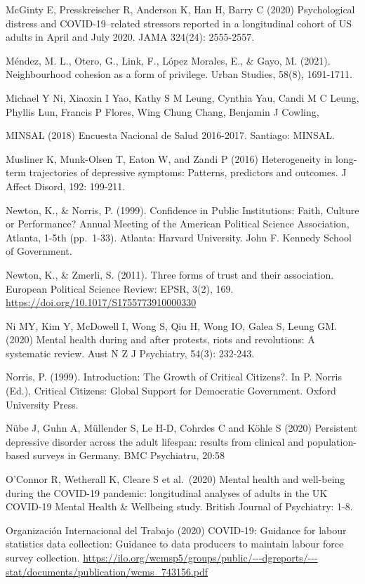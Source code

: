 \documentclass[
  12pt,
]{book}
\begin{document}
McGinty E, Presskreischer R, Anderson K, Han H, Barry C (2020) Psychological distress and COVID-19--related stressors reported in a longitudinal cohort of US adults in April and July 2020. JAMA 324(24): 2555-2557.

Méndez, M. L., Otero, G., Link, F., López Morales, E., \& Gayo, M. (2021). Neighbourhood cohesion as a form of privilege. Urban Studies, 58(8), 1691-1711.

Michael Y Ni, Xiaoxin I Yao, Kathy S M Leung, Cynthia Yau, Candi M C Leung, Phyllis Lun, Francis P Flores, Wing Chung Chang, Benjamin J Cowling,

MINSAL (2018) Encuesta Nacional de Salud 2016-2017. Santiago: MINSAL.

Musliner K, Munk-Olsen T, Eaton W, and Zandi P (2016) Heterogeneity in long-term trajectories of depressive symptoms: Patterns, predictors and outcomes. J Affect Disord, 192: 199-211.

Newton, K., \& Norris, P. (1999). Confidence in Public Institutions: Faith, Culture or Performance? Annual Meeting of the American Political Science Association, Atlanta, 1-5th (pp.~1-33). Atlanta: Harvard University. John F. Kennedy School of Government.

Newton, K., \& Zmerli, S. (2011). Three forms of trust and their association. European Political Science Review: EPSR, 3(2), 169. \url{https://doi.org/10.1017/S1755773910000330}

Ni MY, Kim Y, McDowell I, Wong S, Qiu H, Wong IO, Galea S, Leung GM. (2020) Mental health during and after protests, riots and revolutions: A systematic review. Aust N Z J Psychiatry, 54(3): 232-243.

Norris, P. (1999). Introduction: The Growth of Critical Citizens?. In P. Norris (Ed.), Critical Citizens: Global Support for Democratic Government. Oxford University Press.

Nübe J, Guhn A, Müllender S, Le H-D, Cohrdes C and Köhle S (2020) Persistent depressive disorder across the adult lifespan: results from clinical and population-based surveys in Germany. BMC Psychiatru, 20:58

O'Connor R, Wetherall K, Cleare S et al.~(2020) Mental health and well-being during the COVID-19 pandemic: longitudinal analyses of adults in the UK COVID-19 Mental Health \& Wellbeing study. British Journal of Psychiatry: 1-8.

Organización Internacional del Trabajo (2020) COVID-19: Guidance for labour statistics data collection: Guidance to data producers to maintain labour force survey collection. \url{https://ilo.org/wcmsp5/groups/public/---dgreports/---stat/documents/publication/wcms_743156.pdf}
\end{document}
